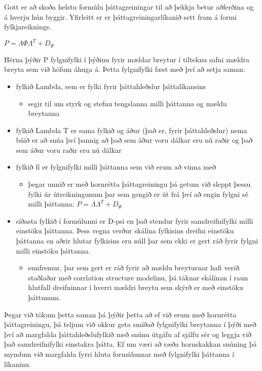 \documentclass[]{book}
\providecommand{\tightlist}{%
  \setlength{\itemsep}{0pt}\setlength{\parskip}{0pt}}
\begin{document}
Gott er að skoða helstu formúlu þáttagreiningar til að þekkja betur aðferðina og á hverju hún byggir. Yfirleitt er er þáttagreiningarlíkanið sett fram á formi fylkjareiknings.

\(P = \Lambda \Phi \Lambda^{T}+D_{\Psi}\)

Hérna þýðir P fylgnifylki í þýðinu fyrir mældar breytur í tilteknu safni mældra breyta sem við höfum áhuga á. Þetta fylgnifylki fæst með því að setja saman:

\begin{itemize}
\tightlist
\item
  fylkið Lambda, sem er fylki fyrir þáttahleðslur þáttalíkansins

  \begin{itemize}
  \tightlist
  \item
    segir til um styrk og stefnu tengslanna milli þáttanna og mældu breytanna
  \end{itemize}
\item
  fylkið Lambda T er sama fylkið og áður (það er, fyrir þáttahleðslur) nema búið er að snúa því þannig að það sem áður voru dálkar eru nú raðir og það sem áður voru raðir eru nú dálkar
\item
  fylkið fí er fylgnifylki milli þáttanna sem við erum að vinna með

  \begin{itemize}
  \tightlist
  \item
    þegar unnið er með hornrétta þáttagreiningu þá getum við sleppt þessu fylki úr útreikningunum þar sem gengið er út frá því að engin fylgni sé milli þáttanna: \(P = \Lambda\Lambda^{T}+D_{\Psi}\)
  \end{itemize}
\item
  síðasta fylkið í formúlunni er D-psi en það stendur fyrir samdreifnifylki milli einstöku þáttanna. Þess vegna verður skálína fylkisins dreifni einstöku þáttanna en aðrir hlutar fylkisins eru núll þar sem ekki er gert ráð fyrir fylgni milli einstöku þáttanna.

  \begin{itemize}
  \tightlist
  \item
    ennfremur, þar sem gert er ráð fyrir að mældu breyturnar hafi verið staðlaðar með corrlation structure modelinu, þá táknar skálínan í raun hlutfall dreifninnar í hverri mældri breytu sem skýrð er með einstöku þáttunum.
  \end{itemize}
\end{itemize}

Þegar við tökum þetta saman þá þýðir þetta að ef við erum með hornrétta þáttagreiningu, þá teljum við okkur geta smíðað fylgnifylki breytanna í þýði með því að margfalda þáttahleðslufylkið með snúnu útgáfu af sjálfu sér og leggja við það samdreifnifylki einstakra þátta. Ef um væri að ræða hornskakkan snúning þá myndum við margfalda fyrri hluta formúlunnar með fylgnifylki þáttanna í líkaninu.
\end{document}

